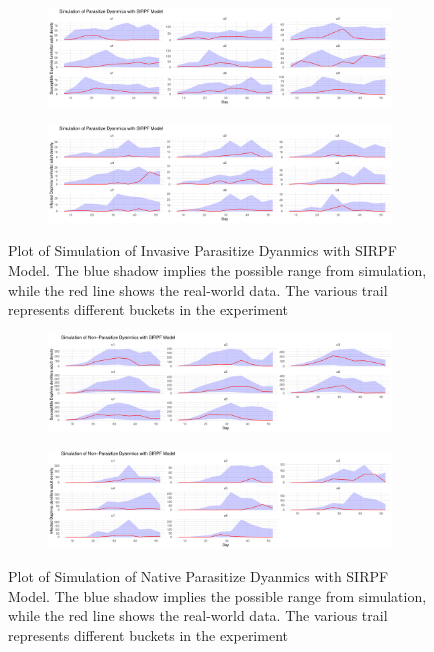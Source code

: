 \documentclass[12pt]{article}
\begin{document}
\begin{figure}[H]
\centering
\begin{subfigure}[b]{\linewidth}
\includegraphics{si-008}
\end{subfigure}
\begin{subfigure}[b]{\linewidth}
\includegraphics{si-009}
\end{subfigure}%
\caption{Plot of Simulation of Invasive Parasitize Dyanmics with SIRPF Model. The blue shadow implies the possible range from simulation, while the red line shows the real-world data. The various trail represents different buckets in the experiment}
\end{figure}

\begin{figure}[H]
\centering
\begin{subfigure}[b]{\linewidth}
\includegraphics{si-010}
\end{subfigure}
\begin{subfigure}[b]{\linewidth}
\includegraphics{si-011}
\end{subfigure}%
\caption{Plot of Simulation of Native Parasitize Dyanmics with SIRPF Model. The blue shadow implies the possible range from simulation, while the red line shows the real-world data. The various trail represents different buckets in the experiment}
\end{figure}
\end{document}
